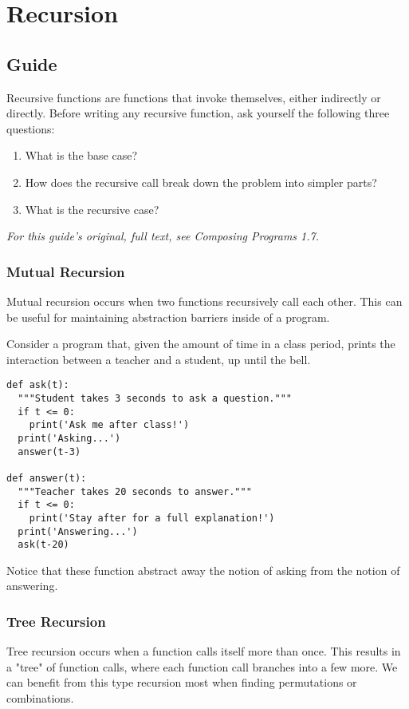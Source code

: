 \documentclass[a4paper]{book}
\begin{document}
\chapter{Recursion}

\section{Guide}

Recursive functions are functions that invoke themselves, either indirectly or directly. Before writing any recursive function, ask yourself the following three questions:
\begin{enumerate}
\item What is the base case?
\item How does the recursive call break down the problem into simpler parts?
\item What is the recursive case?
\end{enumerate}
\textit{For this guide's original, full text, see Composing Programs 1.7.}

\subsection{Mutual Recursion}
Mutual recursion occurs when two functions recursively call each other. This can be useful for maintaining abstraction barriers inside of a program.

Consider a program that, given the amount of time in a class period, prints the interaction between a teacher and a student, up until the bell.
\begin{lstlisting}
def ask(t):
  """Student takes 3 seconds to ask a question."""
  if t <= 0:
  	print('Ask me after class!')
  print('Asking...')
  answer(t-3)

def answer(t):
  """Teacher takes 20 seconds to answer."""
  if t <= 0:
    print('Stay after for a full explanation!')
  print('Answering...')
  ask(t-20)
\end{lstlisting}
Notice that these function abstract away the notion of asking from the notion of answering. 
\subsection{Tree Recursion}
Tree recursion occurs when a function calls itself more than once. This results in a "tree" of function calls, where each function call branches into a few more. We can benefit from this type recursion most when finding permutations or combinations.
\end{document}
